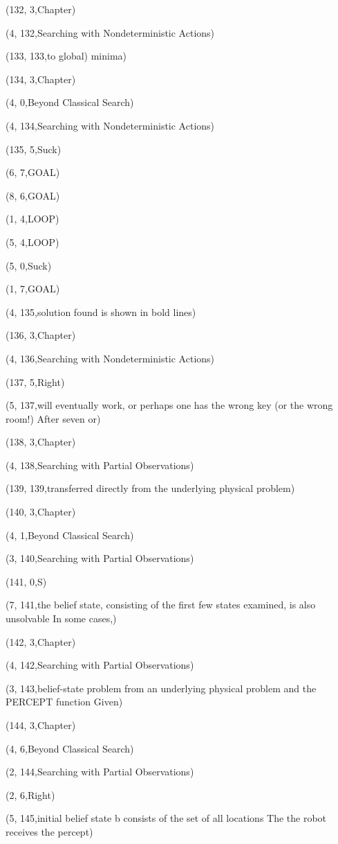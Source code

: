 (132, 3,Chapter)

(4, 132,Searching with Nondeterministic Actions)

(133, 133,to global) minima)

(134, 3,Chapter)

(4, 0,Beyond Classical Search)

(4, 134,Searching with Nondeterministic Actions)

(135, 5,Suck)

(6, 7,GOAL)

(8, 6,GOAL)

(1, 4,LOOP)

(5, 4,LOOP)

(5, 0,Suck)

(1, 7,GOAL)

(4, 135,solution found is shown in bold lines)

(136, 3,Chapter)

(4, 136,Searching with Nondeterministic Actions)

(137, 5,Right)

(5, 137,will eventually work, or perhaps one has the wrong key (or the wrong room!) After seven or)

(138, 3,Chapter)

(4, 138,Searching with Partial Observations)

(139, 139,transferred directly from the underlying physical problem)

(140, 3,Chapter)

(4, 1,Beyond Classical Search)

(3, 140,Searching with Partial Observations)

(141, 0,S)

(7, 141,the belief state, consisting of the ﬁrst few states examined, is also unsolvable In some cases,)

(142, 3,Chapter)

(4, 142,Searching with Partial Observations)

(3, 143,belief-state problem from an underlying physical problem and the PERCEPT function Given)

(144, 3,Chapter)

(4, 6,Beyond Classical Search)

(2, 144,Searching with Partial Observations)

(2, 6,Right)

(5, 145,initial belief state b consists of the set of all locations The the robot receives the percept)

